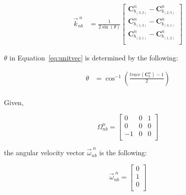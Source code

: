 \begin{parts}
    \begin{equation}
        \begin{split}
            \vec{k}^{\;n}_{nb} & =
            \frac{1}{2\sin(\theta)}
            \begin{bmatrix}
                \mathbf{C}^n_{b_{(3,2)}} - \mathbf{C}^n_{b_{(2,3)}} \\
                \mathbf{C}^n_{b_{(1,3)}} - \mathbf{C}^n_{b_{(3,1)}} \\
                \mathbf{C}^n_{b_{(2,1)}} - \mathbf{C}^n_{b_{(1,2)}} \\
            \end{bmatrix}
            \label{eq:unitvec}
        \end{split}
    \end{equation}

    $\theta$ in Equation~\ref{eq:unitvec} is determined by the following:

    \begin{equation}
        \begin{split}
            \theta & = \cos^{-1}\left(\frac{trace(\mathbf{C}^n_b) - 1}{2} \right)\\
        \end{split}
        \label{eq:theta}
    \end{equation}

    \begin{subparts}

        \solution
        Given,

        \[\Omega^{n}_{nb} =
            \begin{bmatrix}
                0  & 0 & 1 \\
                0  & 0 & 0 \\
                -1 & 0 & 0 \\
            \end{bmatrix}\]

        the angular velocity vector $\vec{\omega}^{\;n}_{nb}$ is the following:

        \[\vec{\omega}^{\;n}_{nb}=
            \begin{bmatrix}
                0 \\
                1 \\
                0 \\
            \end{bmatrix}\]


\end{subparts}
\end{parts}
